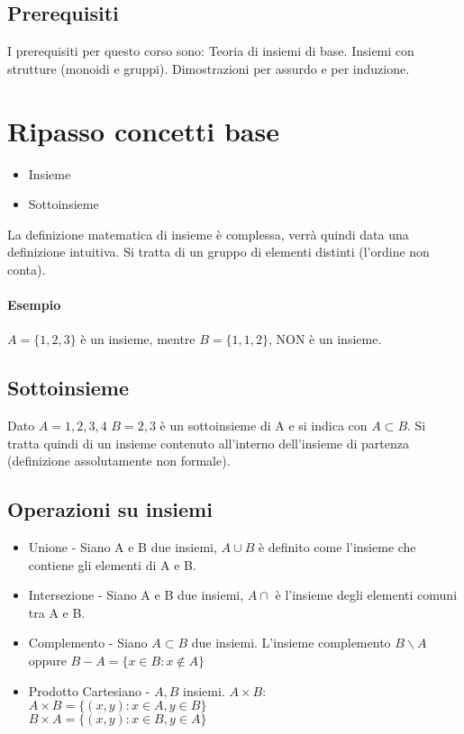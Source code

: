 \subsection*{Prerequisiti}
I prerequisiti per questo corso sono:
Teoria di insiemi di base. Insiemi con strutture (monoidi e gruppi). Dimostrazioni per assurdo e per induzione.

\section{Ripasso concetti base}
\begin{itemize}
	\item Insieme
	\item Sottoinsieme
\end{itemize}
La definizione matematica di insieme è complessa, verrà quindi data una definizione
intuitiva. Si tratta di un gruppo di elementi distinti (l'ordine non conta).
\paragraph*{Esempio} $A = \{1,2,3\}$ è un insieme, mentre $B = \{1, 1, 2\}$, NON è
un insieme.
\subsection{Sottoinsieme}
Dato $A = {1,2,3,4}$ $B={2,3}$ è un sottoinsieme di A e si indica con $A \subset  B$.
Si tratta quindi di un insieme contenuto all'interno dell'insieme di partenza (definizione 
assolutamente non formale).
\subsection{Operazioni su insiemi}
\begin{itemize}
	\item Unione - Siano A e B due insiemi, $A \cup B$ è definito come l'insieme che contiene
	gli elementi di A e B.
	\item Intersezione - Siano A e B due insiemi, $A \cap $ è l'insieme degli elementi
	comuni tra A e B.
	\item Complemento - Siano $A \subset B$ due insiemi. L'insieme complemento
	$B \backslash A$ oppure $B - A = \{ x \in B : x \notin A\}$ 
	\item Prodotto Cartesiano - $A, B$ insiemi. $A \times B$:\\
	$A \times B = \{ (x,y): x \in A, y \in B\}$\\
	$B \times A= \{ (x, y): x \in B, y \in A\}$
\end{itemize}
